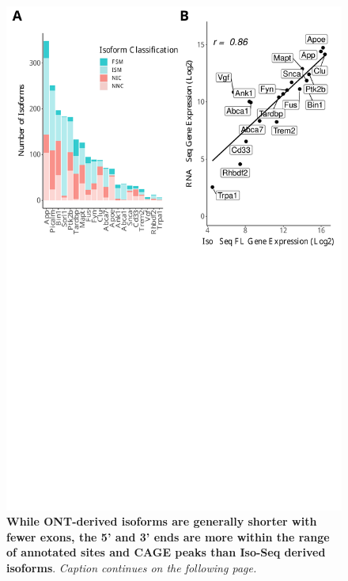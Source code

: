 \begin{figure}[!htp]
	\begin{center}
		\includegraphics[page=3,trim={0 0cm 0 0cm},clip,scale = 0.60]{Figures/ONTvsIsoSeq.pdf}
	\end{center}
	\captionsetup{width=0.95\textwidth}
	\caption[Comparison of ONT-derived and Iso-Seq-derived isoforms for targeted transcriptome profiling]%
	{\textbf{While ONT-derived isoforms are generally shorter with fewer exons, the 5' and 3' ends are more within the range of annotated sites and CAGE peaks than Iso-Seq derived isoforms}. \textit{Caption continues on the following page.}}
	\label{fig:ont_isoseq_description}
\end{figure}
